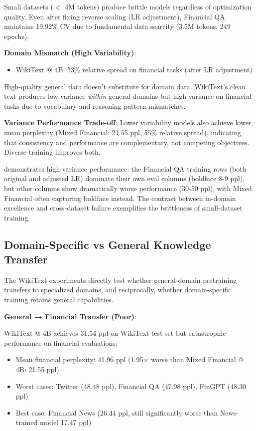 Small datasets ($<$ 4M tokens) produce brittle models regardless of optimization quality. Even after fixing reverse scaling (LR adjustment), Financial QA maintains 19.92\% CV due to fundamental data scarcity (3.5M tokens, 249 epochs).

\textbf{Domain Mismatch (High Variability)}:
\begin{itemize}
\item WikiText @ 4B: \~53\% relative spread on financial tasks (after LR adjustment)
\end{itemize}

High-quality general data doesn't substitute for domain data. WikiText's clean text produces low variance \textit{within} general domains but high variance on financial tasks due to vocabulary and reasoning pattern mismatches.

\textbf{Variance Performance Trade-off}: Lower variability models also achieve lower mean perplexity (Mixed Financial: 21.55 ppl, 55\% relative spread), indicating that consistency and performance are complementary, not competing objectives. Diverse training improves both.



 demonstrates high-variance performance: the Financial QA training rows (both original and adjusted LR) dominate their own eval columns (boldface 8-9 ppl), but other columns show dramatically worse performance (30-50 ppl), with Mixed Financial often capturing boldface instead. The contrast between in-domain excellence and cross-dataset failure exemplifies the brittleness of small-dataset training.

\subsection{Domain-Specific vs General Knowledge Transfer}

The WikiText experiments directly test whether general-domain pretraining transfers to specialized domains, and reciprocally, whether domain-specific training retains general capabilities.

\textbf{General → Financial Transfer (Poor)}:

WikiText @ 4B achieves 31.54 ppl on WikiText test set but catastrophic performance on financial evaluations:
\begin{itemize}
\item Mean financial perplexity: 41.96 ppl (1.95$\times$ worse than Mixed Financial @ 4B: 21.55 ppl)
\item Worst cases: Twitter (48.48 ppl), Financial QA (47.98 ppl), FinGPT (48.30 ppl)
\item Best case: Financial News (26.44 ppl, still significantly worse than News-trained model 17.47 ppl)
\end{itemize}

